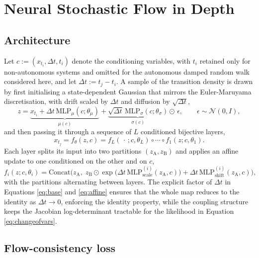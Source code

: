 \chapter{Neural Stochastic Flow in Depth}
\label{app:loss}

\section*{Architecture}

Let $c := (x_{t_i}, \Delta t, t_i)$ denote the conditioning variables, with $t_i$ retained only for non-autonomous systems and omitted for the autonomous damped random walk considered here, and let $\Delta t := t_j - t_i$. A sample of the transition density is drawn by first initialising a state-dependent Gaussian that mirrors the Euler-Maruyama discretisation, with drift scaled by $\Delta t$ and diffusion by $\sqrt{\Delta t}$,
\begin{equation}
    \label{eq:base}
    z = \underbrace{x_{t_i} + \Delta t\,\mathrm{MLP}_\mu(c; \theta_\mu)}_{\mu(c)} + \underbrace{\sqrt{\Delta t}\,\mathrm{MLP}_\sigma(c; \theta_\sigma)}_{\sigma(c)} \odot\, \epsilon, \qquad \epsilon \sim \mathcal{N}(0, I),
\end{equation}
and then passing it through a sequence of $L$ conditioned bijective layers,
\begin{equation}
    \label{eq:coupling}
    x_{t_j} = f_\theta(z, c) = f_L(\,\cdot\,; c, \theta_L) \circ \cdots \circ f_1(z; c, \theta_1).
\end{equation}
Each layer splits its input into two partitions $(z_\mathrm{A}, z_\mathrm{B})$ and applies an affine update to one conditioned on the other and on $c$,
\begin{equation}
    \label{eq:affine}
    f_i(z; c, \theta_i) = \mathrm{Concat}\Big(z_\mathrm{A},\; z_\mathrm{B} \odot \exp\big(\Delta t\,\mathrm{MLP}^{(i)}_\mathrm{scale}(z_\mathrm{A}, c)\big) + \Delta t\,\mathrm{MLP}^{(i)}_\mathrm{shift}(z_\mathrm{A}, c)\Big),
\end{equation}
with the partitions alternating between layers. The explicit factor of $\Delta t$ in Equations \ref{eq:base} and \ref{eq:affine} ensures that the whole map reduces to the identity as $\Delta t \to 0$, enforcing the identity property, while the coupling structure keeps the Jacobian log-determinant tractable for the likelihood in Equation \ref{eq:changeofvars}.

\section*{Flow-consistency loss}

